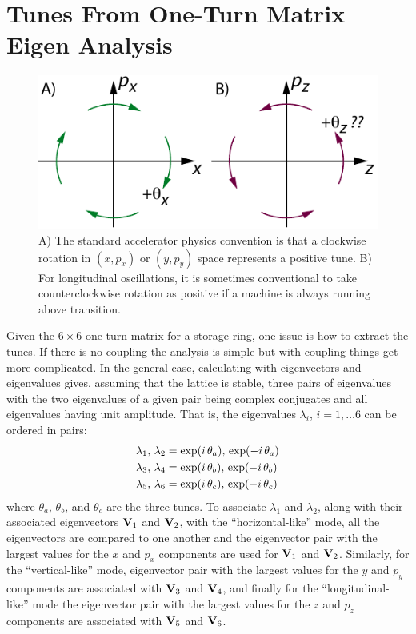 \section{Tunes From One-Turn Matrix Eigen Analysis}
\label{s:eigen.tune}

\begin{figure}[tb]
  \centering
  \includegraphics[width=5in]{tune.pdf}
  \caption[Illustration of a positive tune]{A) The standard accelerator physics convention is that 
a clockwise rotation in $(x, p_x)$ or $(y, p_y)$ space represents a positive tune. B) For longitudinal
oscillations, it is sometimes conventional to take counterclockwise rotation as positive if a machine
is always running above transition.}
  \label{f:tune}
\end{figure}

Given the $6 \times 6$ one-turn matrix for a storage ring, one issue is how to extract the tunes. If
there is no coupling the analysis is simple but with coupling things get more complicated. In the
general case, calculating with eigenvectors and eigenvalues gives, assuming that the lattice is
stable, three pairs of eigenvalues with the two eigenvalues of a given pair being complex
conjugates and all eigenvalues having unit amplitude. That is, the eigenvalues $\lambda_i$, $i =
1, \ldots 6$ can be ordered in pairs:
\begin{align}
  \lambda_1, \, \lambda_2 &= \exp(i \, \theta_a), \, \exp(-i \, \theta_a) \nonumber \\
  \lambda_3, \, \lambda_4 &= \exp(i \, \theta_b), \, \exp(-i \, \theta_b) \label{lleit} \\
  \lambda_5, \, \lambda_6 &= \exp(i \, \theta_c), \, \exp(-i \, \theta_c) \nonumber
\end{align}
where $\theta_a$, $\theta_b$, and $\theta_c$ are the three tunes. To associate $\lambda_1$ and
$\lambda_2$, along with their associated eigenvectors ${\bf V}_1$ and ${\bf V}_2$, with the
``horizontal-like'' mode, all the eigenvectors are compared to one another and the eigenvector pair
with the largest values for the $x$ and $p_x$ components are used for ${\bf V}_1$ and ${\bf V}_2$.
Similarly, for the ``vertical-like'' mode, eigenvector pair with the largest values for the $y$ and
$p_y$ components are associated with ${\bf V}_3$ and ${\bf V}_4$, and finally for the ``longitudinal-like''
mode the eigenvector pair with the largest values for the $z$ and $p_z$ components are associated
with ${\bf V}_5$ and ${\bf V}_6$.

